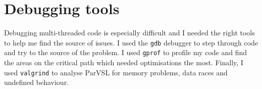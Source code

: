 \section{Debugging tools}

Debugging multi-threaded code is especially difficult and I
needed the right tools to help me find the source of issues. I used
the \verb|gdb| \cite{gdb} debugger to step through code and try to the source
of the problem. I used \verb|gprof| \cite{gprof} to profile my code and find
the areas on the critical path which needed optimisations the most. Finally,
I used \verb|valgrind| \cite{valgrind} to analyse ParVSL for memory
problems, data races and undefined behaviour.
